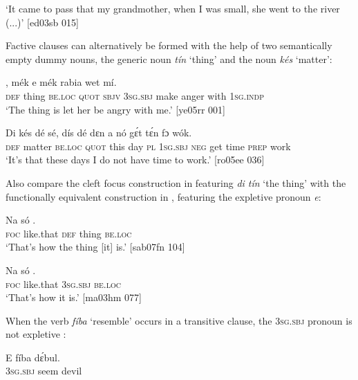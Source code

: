 \glt ‘It came to pass that my grandmother, when I was small, 
she went to the river (...)’ [ed03sb 015]
\z

Factive clauses can alternatively be formed with the help of two semantically empty dummy nouns, the generic noun \textit{tín} ‘thing’ and the noun \textit{kés} ‘matter’:


\ea%
    \label{ex:key:1136}
    \gll {}  ,    mék    e    mék    rabia  wet    mí.\\
\textsc{def}  thing  \textsc{be.loc}  \textsc{quot}    \textsc{sbjv}    \textsc{3sg.sbj}  make  anger  with    \textsc{1sg.indp}\\

\glt ‘The thing is let her be angry with me.’ [ye05rr 001]
\z


\ea%
    \label{ex:key:1137}
    \gll Di  kés    dé    sé,    dís  dé  dɛn  a    nó  gɛ́t  tɛ́n
fɔ  wók.\\
\textsc{def}  matter  \textsc{be.loc}  \textsc{quot}    this  day  \textsc{pl}  \textsc{1sg.sbj}  \textsc{neg}  get  time
\textsc{prep}  work\\
\glt ‘It’s that these days I do not have time to work.’ [ro05ee 036]
\z

Also compare the cleft focus construction in  featuring \textit{di tín} ‘the thing’ with the functionally equivalent construction in , featuring the expletive pronoun \textit{e}:


\ea%
    \label{ex:key:1138}
    \gll Na  só          .\\
\textsc{foc}  like.that  \textsc{def}  thing  \textsc{be.loc}\\

\glt ‘That’s how the thing [it] is.’ [sab07fn 104]
\z


\ea%
    \label{ex:key:1139}
    \gll Na  só        .\\
\textsc{foc}  like.that  \textsc{3sg.sbj}  \textsc{be.loc}\\

\glt ‘That’s how it is.’ [ma03hm 077]
\z

When the verb \textit{fíba} ‘resemble’ occurs in a transitive clause, the \textsc{3sg.sbj} pronoun is not expletive : 


\ea%
    \label{ex:key:1140}
    \gll E    fíba    dɛ́bul.\\
\textsc{3sg.sbj}  seem  devil\\

